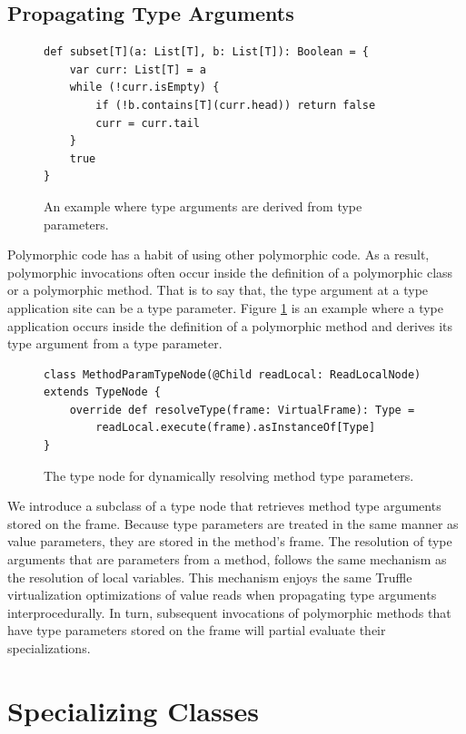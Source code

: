 \subsection{Propagating Type Arguments}

\begin{figure}[!htb]
\begin{verbatim}
def subset[T](a: List[T], b: List[T]): Boolean = {
	var curr: List[T] = a
	while (!curr.isEmpty) {
		if (!b.contains[T](curr.head)) return false
		curr = curr.tail
	}
	true 
}
\end{verbatim}
\caption{An example where type arguments are derived from type parameters.}
\label{impl:list-subset}
\end{figure}

Polymorphic code has a habit of using other polymorphic code.
As a result, polymorphic invocations often occur inside the definition of a polymorphic class or a polymorphic method.
That is to say that, the type argument at a type application site can be a type parameter.
Figure \ref{impl:list-subset} is an example where a type application occurs inside the definition of a polymorphic method and derives its type argument from a type parameter.

\begin{figure}[!htb]
\begin{verbatim}
class MethodParamTypeNode(@Child readLocal: ReadLocalNode) extends TypeNode {
	override def resolveType(frame: VirtualFrame): Type = 
		readLocal.execute(frame).asInstanceOf[Type]
}
\end{verbatim}
\caption{The type node for dynamically resolving method type parameters.}
\label{impl:method-param-typenode}
\end{figure}

We introduce a subclass of a type node that retrieves method type arguments stored on the frame.
Because type parameters are treated in the same manner as value parameters, they are stored in the method's frame.
The resolution of type arguments that are parameters from a method, follows the same mechanism as the resolution of local variables.
This mechanism enjoys the same Truffle virtualization optimizations of value reads when propagating type arguments interprocedurally.
In turn, subsequent invocations of polymorphic methods that have type parameters stored on the frame will partial evaluate their specializations.

\section{Specializing Classes}


